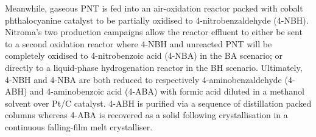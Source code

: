 Meanwhile, gaseous PNT is fed into an air-oxidation reactor packed with cobalt phthalocyanine catalyst to be partially oxidised to 4-nitrobenzaldehyde (4-NBH). Nitroma's two production campaigns allow the reactor effluent to either be sent to a second oxidation reactor where 4-NBH and unreacted PNT will be completely oxidised to 4-nitrobenzoic acid (4-NBA) in the BA scenario; or directly to a liquid-phase hydrogenation reactor in the BH scenario. Ultimately, 4-NBH and 4-NBA are both reduced to respectively 4-aminobenzaldehyde (4-ABH) and 4-aminobenzoic acid (4-ABA) with formic acid diluted in a methanol solvent over Pt/C catalyst. 4-ABH is purified via a sequence of distillation packed columns whereas 4-ABA is recovered as a solid following  crystallisation in a continuous falling-film melt crystalliser.








 

